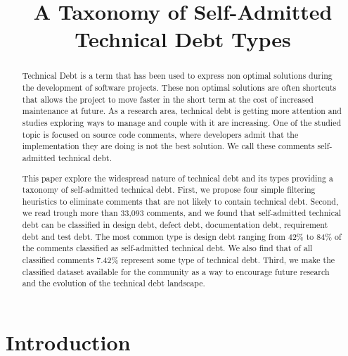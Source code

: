 \documentclass[conference]{IEEEtran}
\begin{document}
\title{A Taxonomy of Self-Admitted Technical Debt Types}

\author{

}

\maketitle

\begin{abstract} Technical Debt is a term that has been used to express non optimal solutions during the development of software projects. These non optimal solutions are often shortcuts that allows the project to move faster in the short term at the cost of increased maintenance at future. As a research area, technical debt is getting more attention and studies exploring  ways to manage and couple with it are increasing. One of the studied topic is focused on source code comments, where developers admit that the implementation they are doing is not the best solution. We call these comments self-admitted technical debt. 
	
This paper explore the widespread nature of technical debt and its types providing a taxonomy of self-admitted technical debt. First, we propose four simple filtering heuristics to eliminate comments that are not likely to contain technical debt. Second, we read trough more than 33,093 comments, and we found that self-admitted technical debt can be classified in design debt, defect debt, documentation debt, requirement debt and test debt. The  most common type is design debt ranging from 42\% to 84\% of the comments classified as self-admitted technical debt. We also find that of all classified comments 7.42\% represent some type of technical debt. Third, we make the classified dataset available for the community as a way to encourage future research and the evolution of the technical debt landscape. 
	
\end{abstract}

\IEEEpeerreviewmaketitle

\section{Introduction}
\label{sec:introduction}

\end{document}

